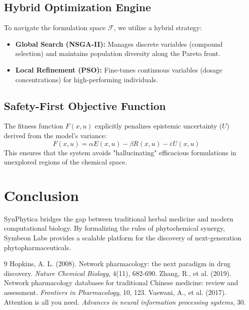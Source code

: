 \documentclass{article}
\begin{document}
\subsection{Hybrid Optimization Engine}
To navigate the formulation space $\mathcal{F}$, we utilize a hybrid strategy:
\begin{itemize}
    \item \textbf{Global Search (NSGA-II):} Manages discrete variables (compound selection) and maintains population diversity along the Pareto front.
    \item \textbf{Local Refinement (PSO):} Fine-tunes continuous variables (dosage concentrations) for high-performing individuals.
\end{itemize}

\subsection{Safety-First Objective Function}
The fitness function $F(x, u)$ explicitly penalizes epistemic uncertainty ($U$) derived from the model's variance:
\begin{equation}
    F(x, u) = \alpha E(x,u) - \beta R(x,u) - \varepsilon U(x,u)
\end{equation}
This ensures that the system avoids "hallucinating" efficacious formulations in unexplored regions of the chemical space.

\section{Conclusion}
SynPhytica bridges the gap between traditional herbal medicine and modern computational biology. By formalizing the rules of phytochemical synergy, Symbeon Labs provides a scalable platform for the discovery of next-generation phytopharmaceuticals.

\begin{thebibliography}{9}
 Hopkins, A. L. (2008). Network pharmacology: the next paradigm in drug discovery. \textit{Nature Chemical Biology}, 4(11), 682-690.
 Zhang, R., et al. (2019). Network pharmacology databases for traditional Chinese medicine: review and assessment. \textit{Frontiers in Pharmacology}, 10, 123.
 Vaswani, A., et al. (2017). Attention is all you need. \textit{Advances in neural information processing systems}, 30.
\end{thebibliography}
\end{document}
